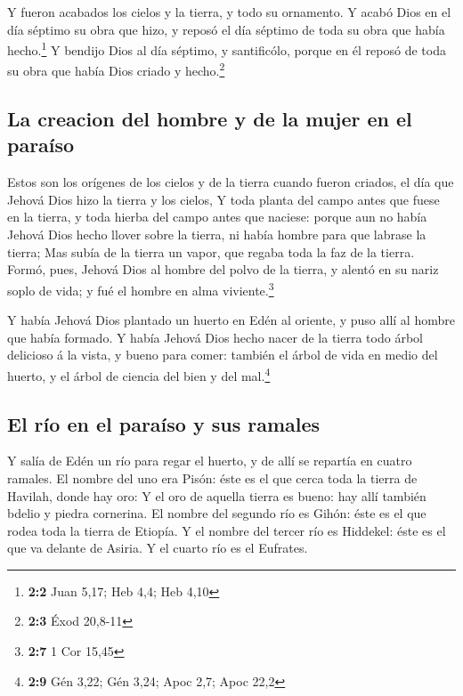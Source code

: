  Y fueron acabados los cielos y la tierra, y todo su
ornamento.  Y acabó Dios en el día séptimo su obra que hizo,
y reposó el día séptimo de toda su obra que había hecho.\footnote{\textbf{2:2}
  Juan 5,17; Heb 4,4; Heb 4,10}  Y bendijo Dios al día
séptimo, y santificólo, porque en él reposó de toda su obra que había
Dios criado y hecho.\footnote{\textbf{2:3} Éxod 20,8-11}

\hypertarget{la-creacion-del-hombre-y-de-la-mujer-en-el-parauxedso}{%
\subsection{La creacion del hombre y de la mujer en el
paraíso}\label{la-creacion-del-hombre-y-de-la-mujer-en-el-parauxedso}}

 Estos son los orígenes de los cielos y de la tierra cuando
fueron criados, el día que Jehová Dios hizo la tierra y los cielos,
 Y toda planta del campo antes que fuese en la tierra, y
toda hierba del campo antes que naciese: porque aun no había Jehová Dios
hecho llover sobre la tierra, ni había hombre para que labrase la
tierra;  Mas subía de la tierra un vapor, que regaba toda la
faz de la tierra.  Formó, pues, Jehová Dios al hombre del
polvo de la tierra, y alentó en su nariz soplo de vida; y fué el hombre
en alma viviente.\footnote{\textbf{2:7} 1 Cor 15,45}

 Y había Jehová Dios plantado un huerto en Edén al oriente,
y puso allí al hombre que había formado.  Y había Jehová
Dios hecho nacer de la tierra todo árbol delicioso á la vista, y bueno
para comer: también el árbol de vida en medio del huerto, y el árbol de
ciencia del bien y del mal.\footnote{\textbf{2:9} Gén 3,22; Gén 3,24;
  Apoc 2,7; Apoc 22,2}

\hypertarget{el-ruxedo-en-el-parauxedso-y-sus-ramales}{%
\subsection{El río en el paraíso y sus
ramales}\label{el-ruxedo-en-el-parauxedso-y-sus-ramales}}

 Y salía de Edén un río para regar el huerto, y de allí se
repartía en cuatro ramales.  El nombre del uno era Pisón:
éste es el que cerca toda la tierra de Havilah, donde hay oro:
 Y el oro de aquella tierra es bueno: hay allí también
bdelio y piedra cornerina.  El nombre del segundo río es
Gihón: éste es el que rodea toda la tierra de Etiopía.  Y
el nombre del tercer río es Hiddekel: éste es el que va delante de
Asiria. Y el cuarto río es el Eufrates.

